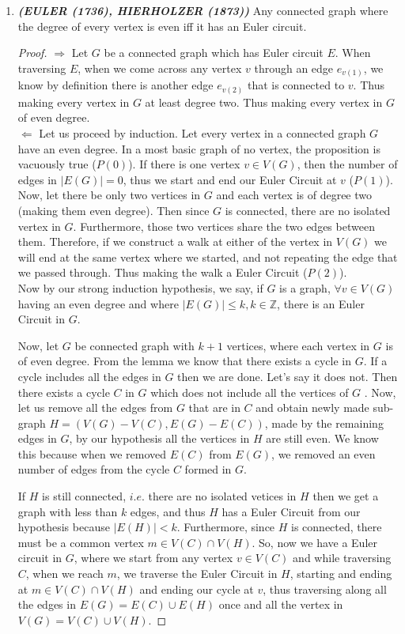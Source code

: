 \documentclass[12pt, fullpage]{article}
\newcommand{\Z}{\mathbb Z}
\begin{document}
\begin{enumerate}
	\item \textit{\textbf{(EULER (1736), HIERHOLZER (1873))}} Any connected graph where the degree of every vertex is even iff it has an Euler circuit.
\begin{proof}
 	$\Longrightarrow$ Let $G$ be a connected graph which has Euler circuit $E$. When traversing $E$, when we come across any vertex $v$ through an edge $e_{v(1)}$, we know by definition there is another edge $e_{v(2)}$ that is connected to $v$. Thus making every vertex in $G$ at least degree two. Thus making every vertex in $G$ of even degree. \\
 	
 	$\Longleftarrow$ Let us proceed by induction. Let every vertex in a connected graph $G$ have an even degree. In a most basic graph of no vertex, the proposition is vacuously true ($P(0)$). If there is one vertex $v \in V(G)$, then the number of edges in $|E(G)| = 0$, thus we start and end our Euler Circuit at $v$ ($P(1)$). Now, let there be only two vertices in $G$ and each vertex is of degree two (making them even degree). Then since $G$ is connected, there are no isolated vertex in $G$. Furthermore, those two vertices share the two edges between them. Therefore, if we construct a walk at either of the vertex in $V(G)$ we will end at the same vertex where we started, and not repeating the edge that we passed through. Thus making the walk a Euler Circuit ($P(2)$).\\ 
 	Now by our strong induction hypothesis, we say, if $G$ is a graph, $\forall v \in V(G)$ having an even degree and where $\vert E(G)\vert \leq k, k \in \Z$, there is an Euler Circuit in $G$.
 	
 	 Now, let $G$ be connected graph with $k+1$ vertices, where each vertex in $G$ is of even degree. From the lemma we know that there exists a cycle in $G$. If a cycle includes all the edges in $G$ then we are done. Let's say it does not. Then there exists a cycle $C$ in $G$ which does not include all the vertices of $G$ . Now, let us remove all the edges from $G$ that are in $C$ and obtain newly made sub-graph $H = (V(G) - V(C) , E(G)-E(C))$, made by the remaining edges in $G$, by our hypothesis all the vertices in $H$ are still even. We know this because when we removed $E(C)$ from $E(G)$, we removed an even number of edges from the cycle $C$ formed in $G$.
 	 
 	  If $H$ is still connected, $i.e.$ there are no isolated vetices in $H$ then we get a graph with less than $k$ edges, and thus $H$ has a Euler Circuit from our hypothesis because $\vert E(H) \vert < k$. Furthermore, since $H$ is connected, there must be a common vertex $m \in V(C) \cap V(H)$. So, now we have a Euler circuit in $G$, where we start from any vertex $v \in V(C)$ and while traversing $C$, when we reach $m$, we traverse the Euler Circuit in $H$, starting and ending at $m \in V(C) \cap V(H)$ and ending our cycle at $v$, thus traversing along all the edges in $E(G) = E(C) \cup E(H)$ once and all the vertex in $V(G) = V(C) \cup V(H)$.
 	 

\end{proof}
\end{enumerate}
\end{document}
